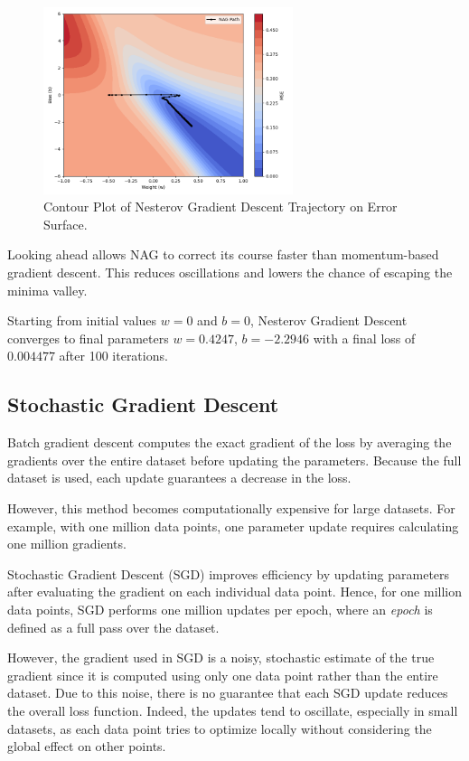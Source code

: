 \begin{figure}[h!]
    \centering
    \includegraphics[width=0.65\textwidth]{content/section01/chapter01/figs/nesterov_grad_desc_contour.png}
    \caption{Contour Plot of Nesterov Gradient Descent Trajectory on Error Surface.}
\end{figure}

Looking ahead allows NAG to correct its course faster than momentum-based gradient descent. This reduces oscillations and lowers the chance of escaping the minima valley.

Starting from initial values \( w = 0 \) and \( b = 0 \), Nesterov Gradient Descent converges to final parameters \( w = 0.4247 \), \( b = -2.2946 \) with a final loss of \( 0.004477 \) after 100 iterations.

\subsection{Stochastic Gradient Descent}

Batch gradient descent computes the exact gradient of the loss by averaging the gradients over the entire dataset before updating the parameters. Because the full dataset is used, each update guarantees a decrease in the loss. 

However, this method becomes computationally expensive for large datasets. For example, with one million data points, one parameter update requires calculating one million gradients.

Stochastic Gradient Descent (SGD) improves efficiency by updating parameters after evaluating the gradient on each individual data point. Hence, for one million data points, SGD performs one million updates per epoch, where an \emph{epoch} is defined as a full pass over the dataset.

However, the gradient used in SGD is a noisy, stochastic estimate of the true gradient since it is computed using only one data point rather than the entire dataset. Due to this noise, there is no guarantee that each SGD update reduces the overall loss function. Indeed, the updates tend to oscillate, especially in small datasets, as each data point tries to optimize locally without considering the global effect on other points.

